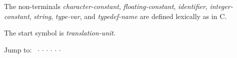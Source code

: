 The non-terminals
\hypertarget{character-constant}{\textit{character-constant}},
\hypertarget{floating-constant}{\textit{floating-constant}},
\hypertarget{identifier}{\textit{identifier}},
\hypertarget{integer-constant}{\textit{integer-constant}},
\hypertarget{string}{\textit{string}},
\hypertarget{type-var}{\textit{type-var}},
and
\hypertarget{typedef-name}{\textit{typedef-name}}
are defined lexically as in C\@.

The start symbol is \textit{translation-unit}.

\ifscreen
{\footnotesize
\medskip
\noindent
Jump to:~ $\cdot$
 $\cdot$
 $\cdot$
 $\cdot$
 $\cdot$
 $\cdot$

\medskip
}
\fi

